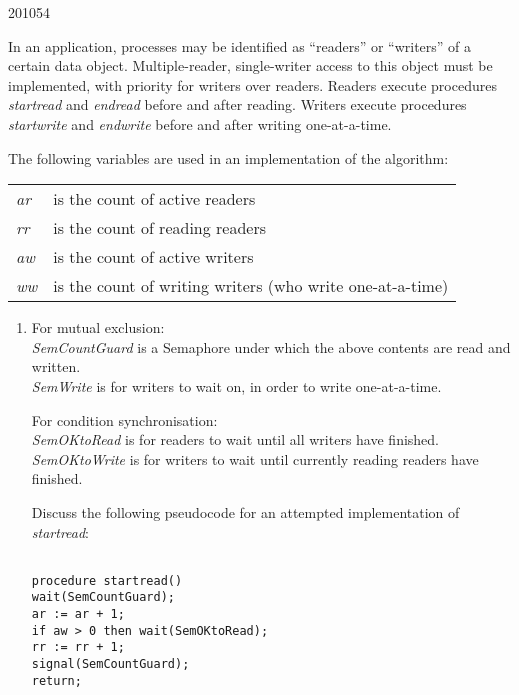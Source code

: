 \documentclass[10pt,\jkfside,a4paper]{article}
\begin{document}
\begin{examquestion}{2010}{5}{4}

In an application, processes may be identified as ``readers'' or ``writers''
of a certain data object. Multiple-reader, single-writer access to this
object must be implemented, with priority for writers over readers. Readers
execute procedures \textit{startread} and \textit{endread} before and after
reading. Writers execute procedures \textit{startwrite} and
\textit{endwrite} before and after writing one-at-a-time.

The following variables are used in an implementation of the algorithm:
\begin{table}[H]
\centering
\begin{tabular}{l l}
\textit{ar} & is the count of active readers \\
\textit{rr} & is the count of reading readers \\
\textit{aw} & is the count of active writers \\
\textit{ww} & is the count of writing writers (who write one-at-a-time) \\
\end{tabular}
\end{table}

\begin{enumerate}[label=(\alph*)]

\item For mutual exclusion:\\
\textit{SemCountGuard} is a Semaphore under which the above contents are
read and written.\\
\textit{SemWrite} is for writers to wait on, in order to write one-at-a-time.

For condition synchronisation:\\
\textit{SemOKtoRead} is for readers to wait until all writers have finished.\\
\textit{SemOKtoWrite} is for writers to wait until currently reading readers
have finished.

Discuss the following pseudocode for an attempted implementation of
\textit{startread}:

\begin{lstlisting}

procedure startread()
wait(SemCountGuard);
ar := ar + 1;
if aw > 0 then wait(SemOKtoRead);
rr := rr + 1;
signal(SemCountGuard);
return;

\end{lstlisting}


\end{enumerate}
\end{examquestion}
\end{document}
